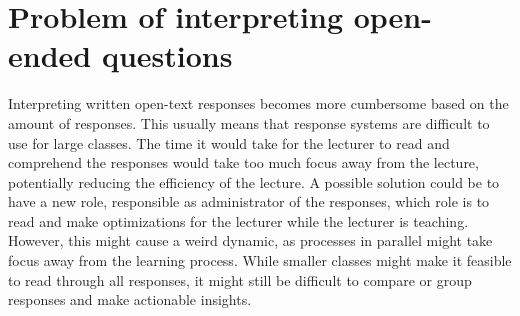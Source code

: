 \section{Problem of interpreting open-ended questions}
Interpreting written open-text responses becomes more cumbersome based on the amount of responses. This usually means that response systems are difficult to use for large classes.  The time it would take for the lecturer to read and comprehend the responses would take too much focus away from the lecture, potentially reducing the efficiency of the lecture. A possible solution could be to have a new role, responsible as administrator of the responses, which role is to read and make optimizations for the lecturer while the lecturer is teaching. However, this might cause a weird dynamic, as processes in parallel might take focus away from the learning process. While smaller classes might make it feasible to read through all responses, it might still be difficult to compare or group responses and make actionable insights. 

